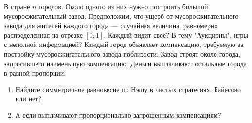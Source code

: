 \begin{problem}\par
В стране  $n$  городов. Около одного из них нужно построить большой мусоросжигательный завод. Предположим, что ущерб от мусоросжигательного завода для жителей каждого города — случайная величина, равномерно распределенная на отрезке  $\left[0;1\right]$. {\red Каждый видит своё? В тему "Аукционы", игры с неполной информацией?} Каждый город объявляет компенсацию, требуемую за постройку мусоросжигательного завода поблизости. Завод строят около города, запросившего наименьшую компенсацию. Деньги выплачивают остальные города в равной пропорции.\par
\begin{enumerate}
\item Найдите симметричное равновесие по Нэшу в чистых стратегиях. {\red Байесово или нет?}
\item {\red А если выплачивают пропорционально запрошенным компенсациям?}
\end{enumerate}


\begin{sol}

\end{sol}
\end{problem}


